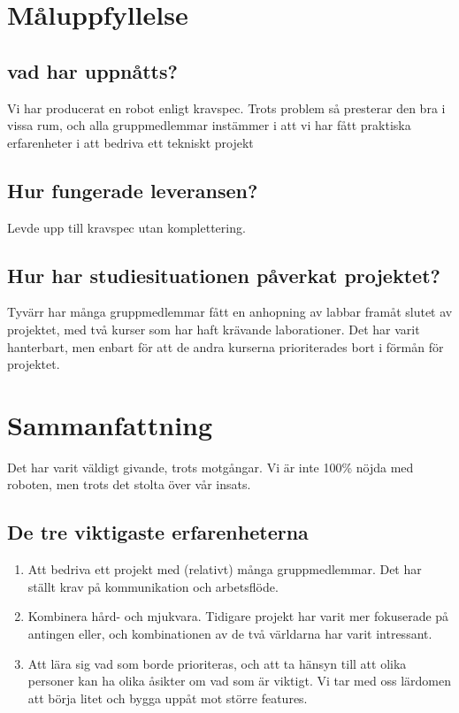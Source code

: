 \documentclass[a4paper,11pt]{article}
\begin{document}
\section{Måluppfyllelse}
\subsection{vad har uppnåtts?}
Vi har producerat en robot enligt kravspec. Trots problem så presterar den bra i vissa rum, och alla gruppmedlemmar instämmer i att vi har fått praktiska erfarenheter i att bedriva ett tekniskt projekt

\subsection{Hur fungerade leveransen?}
Levde upp till kravspec utan komplettering.

\subsection{Hur har studiesituationen påverkat projektet?}
Tyvärr har många gruppmedlemmar fått en anhopning av labbar framåt slutet av projektet, med två kurser som har haft krävande laborationer. Det har varit hanterbart, men enbart för att de andra kurserna prioriterades bort i förmån för projektet.

\section{Sammanfattning}
Det har varit väldigt givande, trots motgångar. Vi är inte 100\% nöjda med roboten, men trots det stolta över vår insats.

\subsection{De tre viktigaste erfarenheterna}
\begin{enumerate}
\item Att bedriva ett projekt med (relativt) många gruppmedlemmar. Det har ställt krav på kommunikation och arbetsflöde.
\item Kombinera hård- och mjukvara. Tidigare projekt har varit mer fokuserade på antingen eller, och kombinationen av de två världarna har varit intressant.
\item Att lära sig vad som borde prioriteras, och att ta hänsyn till att olika personer kan ha olika åsikter om vad som är viktigt. Vi tar med oss lärdomen att börja litet och bygga uppåt mot större features.
\end{enumerate}
\end{document}
